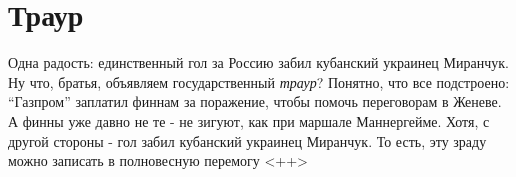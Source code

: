  
 
 
 
 
\chapter{Траур}

Одна радость: единственный гол за Россию забил кубанский украинец Миранчук.  Ну
что, братья, объявляем государственный \emph{траур}?  Понятно, что все
подстроено: \enquote{Газпром} заплатил финнам за поражение, чтобы помочь
переговорам в Женеве. А финны уже давно не те - не зигуют, как при маршале
Маннергейме.  Хотя, с другой стороны - гол забил кубанский украинец Миранчук.
То есть, эту зраду можно записать в полновесную перемогу
  <++>
